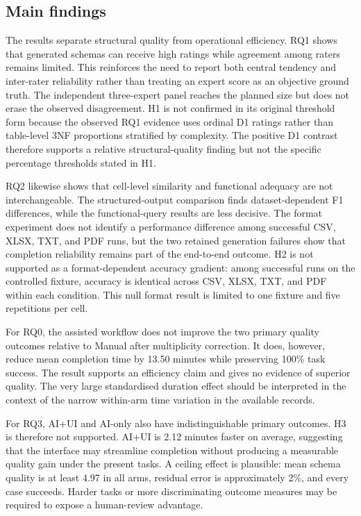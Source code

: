 \documentclass[11pt,a4paper]{article}
\begin{document}
\subsection{Main findings}
The results separate structural quality from operational efficiency. RQ1 shows
that generated schemas can receive high ratings while agreement among raters
remains limited. This reinforces the need to report both central tendency and
inter-rater reliability rather than treating an expert score as an objective
ground truth. The independent three-expert panel reaches the planned size but
does not erase the observed disagreement. H1 is not confirmed in its original
threshold form because the observed RQ1 evidence uses ordinal D1 ratings rather
than table-level 3NF proportions stratified by complexity. The positive D1
contrast therefore supports a relative structural-quality finding but not the
specific percentage thresholds stated in H1.

RQ2 likewise shows that cell-level similarity and functional adequacy are not
interchangeable. The structured-output comparison finds dataset-dependent F1
differences, while the functional-query results are less decisive. The format
experiment does not identify a performance difference among successful CSV,
XLSX, TXT, and PDF runs, but the two retained generation failures show that
completion reliability remains part of the end-to-end outcome.
H2 is not supported as a format-dependent accuracy gradient: among successful
runs on the controlled fixture, accuracy is identical across CSV, XLSX, TXT,
and PDF within each condition. This null format result is limited to one
fixture and five repetitions per cell.

For RQ0, the assisted workflow does not improve the two primary quality
outcomes relative to Manual after multiplicity correction. It does, however,
reduce mean completion time by 13.50 minutes while preserving 100\% task
success. The result supports an efficiency claim and gives no evidence of superior
quality. The very large standardised duration effect should be interpreted in
the context of the narrow within-arm time variation in the available records.

For RQ3, AI+UI and AI-only also have indistinguishable primary outcomes. H3 is
therefore not supported. AI+UI is 2.12 minutes faster on average, suggesting
that the interface may streamline completion without producing a measurable
quality gain under the present tasks. A ceiling effect is plausible: mean
schema quality is at least 4.97 in all arms, residual error is approximately
2\%, and every case succeeds. Harder tasks or more discriminating outcome
measures may be required to expose a human-review advantage.
\end{document}
